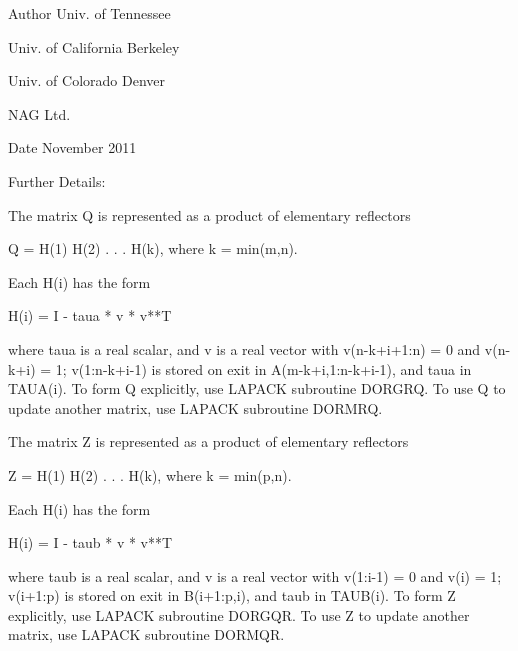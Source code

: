 \begin{DoxyAuthor}{Author}
Univ. of Tennessee 

Univ. of California Berkeley 

Univ. of Colorado Denver 

N\+A\+G Ltd. 
\end{DoxyAuthor}
\begin{DoxyDate}{Date}
November 2011 
\end{DoxyDate}
\begin{DoxyParagraph}{Further Details\+: }
\begin{DoxyVerb}  The matrix Q is represented as a product of elementary reflectors

     Q = H(1) H(2) . . . H(k), where k = min(m,n).

  Each H(i) has the form

     H(i) = I - taua * v * v**T

  where taua is a real scalar, and v is a real vector with
  v(n-k+i+1:n) = 0 and v(n-k+i) = 1; v(1:n-k+i-1) is stored on exit in
  A(m-k+i,1:n-k+i-1), and taua in TAUA(i).
  To form Q explicitly, use LAPACK subroutine DORGRQ.
  To use Q to update another matrix, use LAPACK subroutine DORMRQ.

  The matrix Z is represented as a product of elementary reflectors

     Z = H(1) H(2) . . . H(k), where k = min(p,n).

  Each H(i) has the form

     H(i) = I - taub * v * v**T

  where taub is a real scalar, and v is a real vector with
  v(1:i-1) = 0 and v(i) = 1; v(i+1:p) is stored on exit in B(i+1:p,i),
  and taub in TAUB(i).
  To form Z explicitly, use LAPACK subroutine DORGQR.
  To use Z to update another matrix, use LAPACK subroutine DORMQR.\end{DoxyVerb}
 
\end{DoxyParagraph}
